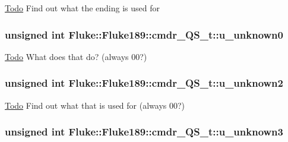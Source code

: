 \label{structFluke_1_1Fluke189_1_1cmdr__QS__t_a08dec92163b6c7a734cdf4aa185d0875}
\begin{Desc}
\item[\hyperlink{todo__todo000007}{Todo}]Find out what the ending is used for \end{Desc}
\hypertarget{structFluke_1_1Fluke189_1_1cmdr__QS__t_a944537557b063c776a16a12218d7e8f8}{
\subsubsection[{u\_\-unknown0}]{\setlength{\rightskip}{0pt plus 5cm}unsigned int {\bf Fluke::Fluke189::cmdr\_\-QS\_\-t::u\_\-unknown0}}}
\label{structFluke_1_1Fluke189_1_1cmdr__QS__t_a944537557b063c776a16a12218d7e8f8}
\begin{Desc}
\item[\hyperlink{todo__todo000002}{Todo}]What does that do? (always 00?) \end{Desc}
\hypertarget{structFluke_1_1Fluke189_1_1cmdr__QS__t_ada1764cd45a6a8339b44a41d30fbdb86}{
\subsubsection[{u\_\-unknown2}]{\setlength{\rightskip}{0pt plus 5cm}unsigned int {\bf Fluke::Fluke189::cmdr\_\-QS\_\-t::u\_\-unknown2}}}
\label{structFluke_1_1Fluke189_1_1cmdr__QS__t_ada1764cd45a6a8339b44a41d30fbdb86}
\begin{Desc}
\item[\hyperlink{todo__todo000004}{Todo}]Find out what that is used for (always 00?) \end{Desc}
\hypertarget{structFluke_1_1Fluke189_1_1cmdr__QS__t_a5df8b378d557e36494d127471e465612}{
\subsubsection[{u\_\-unknown3}]{\setlength{\rightskip}{0pt plus 5cm}unsigned int {\bf Fluke::Fluke189::cmdr\_\-QS\_\-t::u\_\-unknown3}}}
